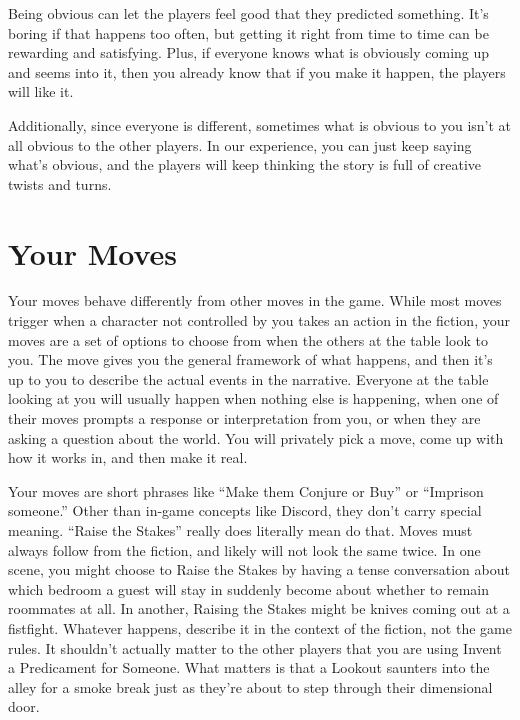 \documentclass[
  oneside,
  statementpaper,
  9pt]{memoir}
\begin{document}
Being obvious can let the players feel good that they predicted
something. It's boring if that happens too often, but getting it right
from time to time can be rewarding and satisfying. Plus, if everyone
knows what is obviously coming up and seems into it, then you already
know that if you make it happen, the players will like it.

Additionally, since everyone is different, sometimes what is obvious to
you isn't at all obvious to the other players. In our experience, you
can just keep saying what's obvious, and the players will keep thinking
the story is full of creative twists and turns.

\hypertarget{your-moves}{%
\section{Your Moves}\label{your-moves}}

Your moves behave differently from other moves in the game. While most
moves trigger when a character not controlled by you takes an action in
the fiction, your moves are a set of options to choose from when the
others at the table look to you. The move gives you the general
framework of what happens, and then it's up to you to describe the
actual events in the narrative. Everyone at the table looking at you
will usually happen when nothing else is happening, when one of their
moves prompts a response or interpretation from you, or when they are
asking a question about the world. You will privately pick a move, come
up with how it works in, and then make it real.

Your moves are short phrases like ``Make them Conjure or Buy'' or
``Imprison someone.'' Other than in-game concepts like Discord, they
don't carry special meaning. ``Raise the Stakes'' really does literally
mean do that. Moves must always follow from the fiction, and likely will
not look the same twice. In one scene, you might choose to Raise the
Stakes by having a tense conversation about which bedroom a guest will
stay in suddenly become about whether to remain roommates at all. In
another, Raising the Stakes might be knives coming out at a fistfight.
Whatever happens, describe it in the context of the fiction, not the
game rules. It shouldn't actually matter to the other players that you
are using Invent a Predicament for Someone. What matters is that a
Lookout saunters into the alley for a smoke break just as they're about
to step through their dimensional door.
\end{document}
